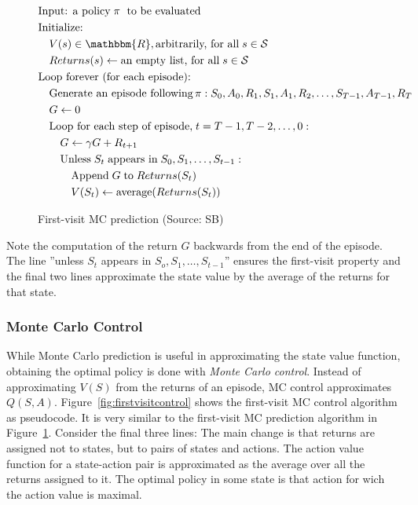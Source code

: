 \begin{figure}
\begin{tcolorbox}[colback=code]
\small
\vspace{-\baselineskip}
\begin{align*}
& \text{Input: a policy}\;\pi\;\text{ to be evaluated} \\
& \text{Initialize:} \\
& \quad V(s) \in \mathbbm{R}, \text{arbitrarily, for all}\;s \in \mathcal{S} \\
& \quad Returns(s) \leftarrow \text{an empty list, for all}\; s \in \mathcal{S} \\
& \text{Loop forever (for each episode):}\\
& \quad \text{Generate an episode following}\, \pi: S_0, A_0, R_1, S_1, A_1, R_2, \ldots, S_{T-1}, A_{T-1}, R_{T} \\
& \quad G \leftarrow 0 \\
& \quad \text{Loop for each step of episode,}\; t = T-1, T-2, \ldots, 0: \\
& \quad \quad G \leftarrow \gamma G + R_{t+1} \\
& \quad \quad \text{Unless}\; S_t\; \text{appears in}\; S_0, S_1, \ldots, S_{t-1}: \\
& \quad \quad \quad \text{Append}\; G\; \text{to}\; Returns(S_t) \\
& \quad \quad \quad V(S_t) \leftarrow \operatorname{average}(Returns(S_t))
\end{align*}
\end{tcolorbox}
\caption[First-visit MC prediction]{First-visit MC prediction (Source: SB)}
\label{fig:firstvisitmc}
\end{figure}

Note the computation of the return $G$ backwards from the end of the episode. The line ''unless $S_t$ appears in $S_o, S_1, \ldots, S_{t-1}$'' ensures the first-visit property and the final two lines approximate the state value by the average of the returns for that state.

\subsubsection*{Monte Carlo Control}

While Monte Carlo prediction is useful in approximating the state value function, obtaining the optimal policy is done with \emph{Monte Carlo control}. Instead of approximating $V(S)$ from the returns of an episode, MC control approximates $Q(S, A)$. Figure~\ref{fig:firstvisitcontrol} shows the first-visit MC control algorithm as pseudocode. It is very similar to the first-visit MC prediction algorithm in Figure~\ref{fig:firstvisitmc}. Consider the final three lines: The main change is that returns are assigned not to states, but to pairs of states and actions. The action value function for a state-action pair is approximated as the average over all the returns assigned to it. The optimal policy in some state is that action for wich the action value is maximal. 

